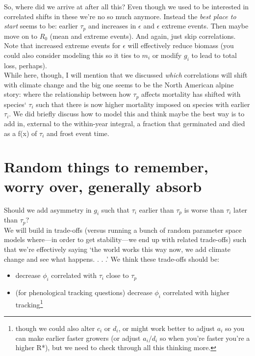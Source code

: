 \documentclass[11pt,a4paper,oneside]{article}
\begin{document}
So, where did we arrive at after all this? Even though we used to be interested in correlated shifts in these we're no so much anymore. Instead the \emph{best place to start} seems to be: earlier \(\tau_{p}\) and increases in \(\epsilon\) and \(\epsilon\) extreme events. Then maybe move on to \(R_{0}\) (mean and extreme events). And again, just skip correlations.\\

Note that increased extreme events for \(\epsilon\)  will effectively reduce biomass (you could also consider modeling this so it ties to \(m_{i}\) or modify \(g_{i}\) to lead to total loss, perhaps).\\

While here, though, I will mention that we discussed \emph{which} correlations will shift with climate change and the big one seems to be the North American alpine story: where the relationship between how \(\tau_{p}\) affects mortality has shifted with species` \(\tau_{i}\) such that there is now higher mortality imposed on species with earlier \(\tau_{i}\). We did briefly discuss how to model this and think maybe the best way is to add in, external to the within-year integral, a fraction that germinated and died as a f(x) of \(\tau_{i}\)  and frost event time.\\

\section{Random things to remember, worry over, generally absorb}

 Should we add asymmetry in \(g_{i}\) such that \(\tau_{i}\) earlier than \(\tau_{p}\) is worse than \(\tau_{i}\) later than \(\tau_{p}\)?\\

 We will build in trade-offs (versus running a bunch of random parameter space models where---in order to get stability---we end up with related trade-offs) such that we're effectively saying `the world works this way now, we add climate change and see what happens. . . .' We think these trade-offs should be:
\begin{itemize}
\item decrease \(\phi_{i}\) correlated with  \(\tau_{i}\) close to  \(\tau_{p}\)
\item (for phenological tracking questions) decrease \(\phi_{i}\) correlated with higher tracking\footnote{though we could also alter \(c_{i}\) or \(d_{i}\), or might work better to adjust \(a_{i}\) so you can make earlier faster growers (or adjust \(a_{i}/d_{i}\) so when you're faster you're a higher R*), but we need to check through all this thinking more.}
\end{itemize}
\end{document}
